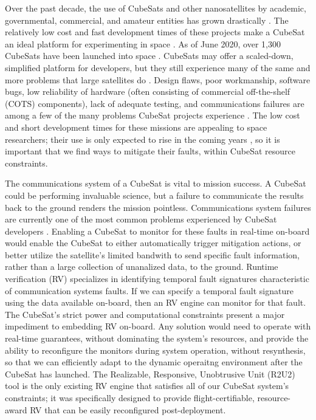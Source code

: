 \documentclass[conf]{new-aiaa}
\begin{document}
Over the past decade, the use of CubeSats and other nanosatellites by academic, governmental, commercial, and amateur entities has grown drastically \cite{cubesat101,Poghosyan2016,Villela2019}. The relatively low cost and fast development times of these projects make a CubeSat an ideal platform for experimenting in space \cite{cubesat101}. As of June 2020, over 1,300 CubeSats have been launched into space \cite{Kulu2020}. CubeSats may offer a scaled-down, simplified platform for developers, but they still experience many of the same and more problems that large satellites do \cite{Improving2017}. Design flaws, poor workmanship, software bugs, low reliability of hardware (often consisting of commercial off-the-shelf (COTS) components), lack of adequate testing, and communications failures are among a few of the many problems CubeSat projects experience \cite{Improving2017}. 
The low cost and short development times for these missions are appealing to space researchers;
 their use is only expected to rise in the coming years \cite{Improving2017,cubesat101}, so it is important that we find ways to mitigate their faults, within CubeSat resource constraints. 

The communications system of a CubeSat is vital to mission success. A CubeSat could be performing invaluable science, but a failure to communicate the results back to the ground renders the mission pointless. Communications system failures are currently one of the most common problems experienced by CubeSat developers \cite{Improving2017,Langer2016}. Enabling a CubeSat to monitor for these faults in real-time on-board would enable the CubeSat to either automatically trigger mitigation actions, or better utilize the satellite's limited bandwith to send specific fault information, rather than a large collection of unanalized data, to the ground. 
Runtime verification (RV) specializes in identifying temporal fault signatures characteristic of communication systems faults. If we can specify a temporal fault signature using the data available on-board, then an RV engine can monitor for that fault. The CubeSat's strict power and computational constraints present a major impediment to embedding RV on-board. Any solution would need to operate with real-time guarantees, without dominating the system's resources, and provide the ability to reconfigure the monitors during system operation, without resynthesis, so that we can efficiently adapt to the dynamic operaitng environment after the CubeSat has launched. 
The Realizable, Responsive, Unobtrusive Unit (R2U2) tool is the only existing RV engine that satisfies all of our CubeSat system's constraints; it was specifically designed to provide flight-certifiable, resource-award RV that can be easily reconfigured post-deployment. 
\end{document}
